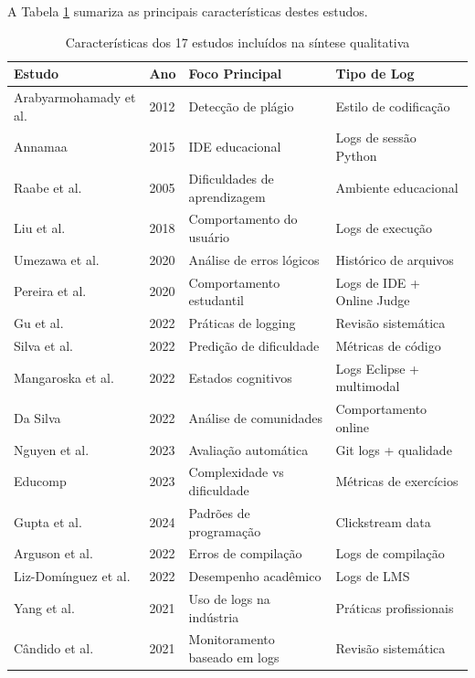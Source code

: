A Tabela \ref{tab:caracteristicas} sumariza as principais características destes estudos.

\begin{table}[h!]
\centering
\small
\begin{tabular}{|p{3cm}|p{2cm}|p{3cm}|p{4cm}|}
\hline
\textbf{Estudo} & \textbf{Ano} & \textbf{Foco Principal} & \textbf{Tipo de Log} \\
\hline
Arabyarmohamady et al. & 2012 & Detecção de plágio & Estilo de codificação \\
\hline
Annamaa & 2015 & IDE educacional & Logs de sessão Python \\
\hline
Raabe et al. & 2005 & Dificuldades de aprendizagem & Ambiente educacional \\
\hline
Liu et al. & 2018 & Comportamento do usuário & Logs de execução \\
\hline
Umezawa et al. & 2020 & Análise de erros lógicos & Histórico de arquivos \\
\hline
Pereira et al. & 2020 & Comportamento estudantil & Logs de IDE + Online Judge \\
\hline
Gu et al. & 2022 & Práticas de logging & Revisão sistemática \\
\hline
Silva et al. & 2022 & Predição de dificuldade & Métricas de código \\
\hline
Mangaroska et al. & 2022 & Estados cognitivos & Logs Eclipse + multimodal \\
\hline
Da Silva & 2022 & Análise de comunidades & Comportamento online \\
\hline
Nguyen et al. & 2023 & Avaliação automática & Git logs + qualidade \\
\hline
Educomp & 2023 & Complexidade vs dificuldade & Métricas de exercícios \\
\hline
Gupta et al. & 2024 & Padrões de programação & Clickstream data \\
\hline
Arguson et al. & 2022 & Erros de compilação & Logs de compilação \\
\hline
Liz-Domínguez et al. & 2022 & Desempenho acadêmico & Logs de LMS \\
\hline
Yang et al. & 2021 & Uso de logs na indústria & Práticas profissionais \\
\hline
Cândido et al. & 2021 & Monitoramento baseado em logs & Revisão sistemática \\
\hline
\end{tabular}
\caption{Características dos 17 estudos incluídos na síntese qualitativa}
\label{tab:caracteristicas}
\end{table}

